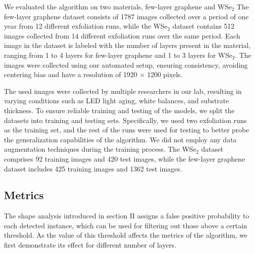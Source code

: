 \documentclass[reprint, prl, superscriptaddress, floatfix]{revtex4-2}
\begin{document}
We evaluated the algorithm on two materials, few-layer graphene and WSe$_2$
The few-layer graphene dataset consists of 1787 images collected over a period of one year from 12 different exfoliation runs, while the WSe$_2$ dataset contains 512 images collected from 14 different exfoliation runs over the same period.
Each image in the dataset is labeled with the number of layers present in the material, ranging from 1 to 4 layers for few-layer graphene and 1 to 3 layers for WSe$_2$. The images were collected using our automated setup, ensuring consistency, avoiding centering bias and have a resolution of 1920 $\times$ 1200 pixels.

The used images were collected by multiple researchers in our lab, resulting in varying conditions such as LED light aging, white balances, and substrate thickness. To ensure reliable training and testing of the models, we split the datasets into training and testing sets. Specifically, we used two exfoliation runs as the training set, and the rest of the runs were used for testing to better probe the generalization capabilities of the algorithm.
We did not employ any data augmentation techniques during the training process. 
The WSe$_2$ dataset comprises 92 training images and 420 test images, while the few-layer graphene dataset includes 425 training images and 1362 test images.

\subsection{Metrics}
The shape analysis introduced in section II assigns a false positive probability to each detected instance, which can be used for filtering out those above a certain threshold.  
As the value of this threshold affects the metrics of the algorithm, we first demonstrate its effect for different number of layers. 
\end{document}
